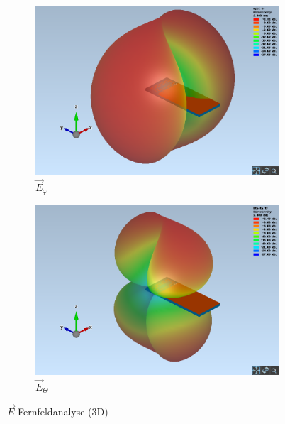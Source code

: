 \begin{figure}[h!]
	\begin{subfigure}[b]{0.48\textwidth}
		\includegraphics[width=1\textwidth]{../fig/plt/crazy_stuff_l2_3d_ephi.png}
		\caption{$\vec{E}_{\varphi}$}
	\end{subfigure}
	\begin{subfigure}[b]{0.48\textwidth}
		\includegraphics[width=1\textwidth]{../fig/plt/crazy_stuff_l2_3d_etheta.png}
		\caption{$\vec{E}_{\Theta}$}
	\end{subfigure}
	\caption{$\vec{E}$ Fernfeldanalyse (3D)}
\end{figure}


